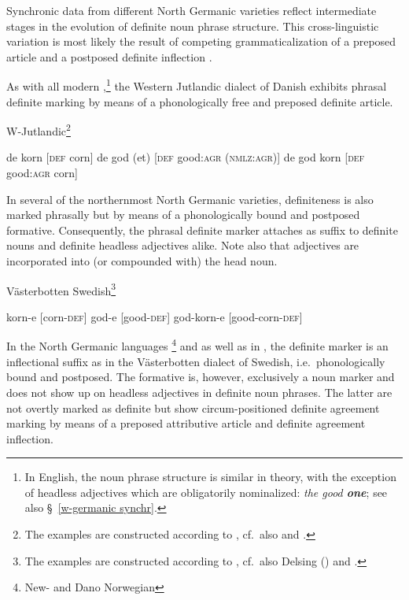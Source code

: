 {Synchronic data from different North Germanic varieties reflect intermediate stages in the evolution of definite noun phrase structure. This cross-linguistic variation is most likely the result of competing grammaticalization of a preposed article and a postposed definite inflection \citep{dahl2003}. 

As with all modern ,\footnote{In English, the noun phrase structure is similar in theory, with the exception of headless adjectives which are obligatorily nominalized: \textit{the good \textbf{one}}; see also \S~\ref{w-germanic synchr}.} the Western Jutlandic dialect of Danish exhibits phrasal definite marking by means of a phonologically free and preposed definite article.
\begin{exe}
\ex \rm{W-Jutlandic}\footnote{The examples are constructed according to \citet{lund1932}, cf.~also \citet[121–122]{delsing1993} and \citet{dahl2003}.}
\begin{xlist}
\ex de korn \rm{[\textsc{def} corn]}
\ex de god (et) \rm{[\textsc{def} good:\textsc{agr} (\textsc{nmlz:agr})]}
\ex de god korn \rm{[\textsc{def} good:\textsc{agr} corn]}
\end{xlist}
\end{exe}
In several of the northernmost North Germanic varieties, definiteness is also marked phrasally but by means of a phonologically bound and postposed formative. Consequently, the phrasal definite marker attaches as suffix to definite nouns and definite headless adjectives alike. Note also that adjectives are incorporated into (or compounded with) the head noun. 
\begin{exe}
\ex \rm{Västerbotten Swedish}\footnote{The examples are constructed according to \citet{astrom1893}, cf.~also Delsing (\citeyear[122–123]{delsing1993}) and \cite{dahl2003}.}
\begin{xlist}
\ex korn-e \rm{[corn-\textsc{def}]}
\ex god-e \rm{[good-\textsc{def}]}
\ex god-korn-e \rm{[good-corn-\textsc{def}]}
\end{xlist}
\end{exe}
In the North Germanic languages \footnote{New- and Dano Norwegian} and  as well as in , the definite marker is an inflectional suffix as in the Västerbotten dialect of Swedish, i.e.~phonologically bound and postposed. The formative is, however, exclusively a noun marker and does not show up on headless adjectives in definite noun phrases. The latter are not overtly marked as definite but show circum-positioned definite agreement marking by means of a preposed attributive article and definite agreement inflection.
}
